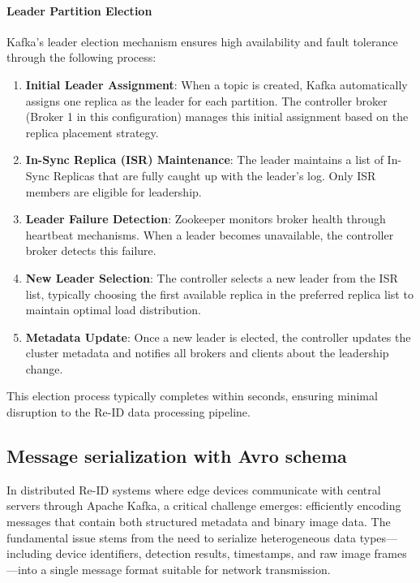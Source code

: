 \documentclass[../main.tex]{subfiles}
\begin{document}
\paragraph{Leader Partition Election}

Kafka's leader election mechanism ensures high availability and fault tolerance through the following process:

\begin{enumerate}
    \item \textbf{Initial Leader Assignment}: When a topic is created, Kafka automatically assigns one replica as the leader for each partition. The controller broker (Broker 1 in this configuration) manages this initial assignment based on the replica placement strategy.
    
    \item \textbf{In-Sync Replica (ISR) Maintenance}: The leader maintains a list of In-Sync Replicas that are fully caught up with the leader's log. Only ISR members are eligible for leadership.
    
    \item \textbf{Leader Failure Detection}: Zookeeper monitors broker health through heartbeat mechanisms. When a leader becomes unavailable, the controller broker detects this failure.
    
    \item \textbf{New Leader Selection}: The controller selects a new leader from the ISR list, typically choosing the first available replica in the preferred replica list to maintain optimal load distribution.
    
    \item \textbf{Metadata Update}: Once a new leader is elected, the controller updates the cluster metadata and notifies all brokers and clients about the leadership change.
\end{enumerate}

This election process typically completes within seconds, ensuring minimal disruption to the Re-ID data processing pipeline.

\subsection{Message serialization with Avro schema}


In distributed Re-ID systems where edge devices communicate with central servers through Apache Kafka, a critical challenge emerges: efficiently encoding messages that contain both structured metadata and binary image data. The fundamental issue stems from the need to serialize heterogeneous data types—including device identifiers, detection results, timestamps, and raw image frames—into a single message format suitable for network transmission.
\end{document}

